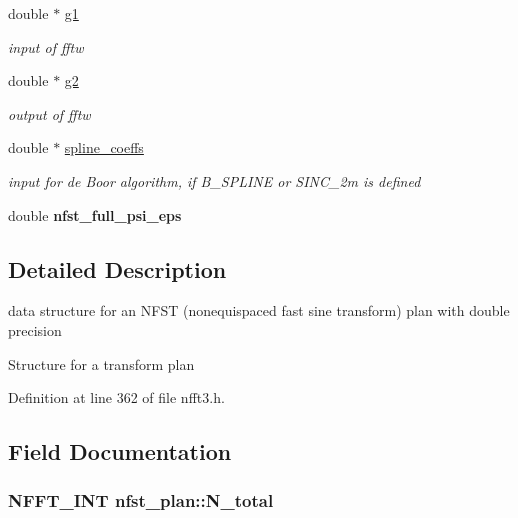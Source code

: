 \begin{DoxyCompactItemize}
\item 
\hypertarget{structnfst__plan_a06cd5d11b13d590c9ab3a88d93b21fb2}{double $\ast$ \hyperlink{structnfst__plan_a06cd5d11b13d590c9ab3a88d93b21fb2}{g1}}\label{structnfst__plan_a06cd5d11b13d590c9ab3a88d93b21fb2}

\begin{DoxyCompactList}\small\item\em input of fftw \end{DoxyCompactList}\item 
\hypertarget{structnfst__plan_a7b67e2cf657227ae46d13fa239d534f7}{double $\ast$ \hyperlink{structnfst__plan_a7b67e2cf657227ae46d13fa239d534f7}{g2}}\label{structnfst__plan_a7b67e2cf657227ae46d13fa239d534f7}

\begin{DoxyCompactList}\small\item\em output of fftw \end{DoxyCompactList}\item 
\hypertarget{structnfst__plan_a23bec4401a652efc87ee6781061c9363}{double $\ast$ \hyperlink{structnfst__plan_a23bec4401a652efc87ee6781061c9363}{spline\-\_\-coeffs}}\label{structnfst__plan_a23bec4401a652efc87ee6781061c9363}

\begin{DoxyCompactList}\small\item\em input for de Boor algorithm, if B\-\_\-\-S\-P\-L\-I\-N\-E or S\-I\-N\-C\-\_\-2m is defined \end{DoxyCompactList}\item 
\hypertarget{structnfst__plan_a255445e279e22fb6224821011e117a7c}{double {\bfseries nfst\-\_\-full\-\_\-psi\-\_\-eps}}\label{structnfst__plan_a255445e279e22fb6224821011e117a7c}

\end{DoxyCompactItemize}


\subsection{Detailed Description}
data structure for an N\-F\-S\-T (nonequispaced fast sine transform) plan with double precision 

Structure for a transform plan 

Definition at line 362 of file nfft3.\-h.



\subsection{Field Documentation}
\hypertarget{structnfst__plan_a80f1cf1229d71acb850bb407f565aafe}{
\subsubsection[{N\-\_\-total}]{\setlength{\rightskip}{0pt plus 5cm}N\-F\-F\-T\-\_\-\-I\-N\-T nfst\-\_\-plan\-::\-N\-\_\-total}}\label{structnfst__plan_a80f1cf1229d71acb850bb407f565aafe}


